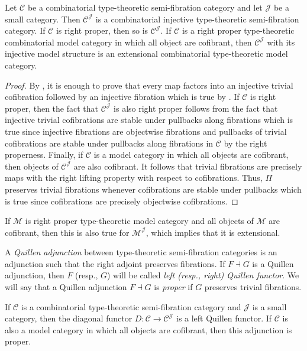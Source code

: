 \documentclass[reqno]{amsart}
\theoremstyle{definition}
\theoremstyle{remark}
\newcommand{\scat}[1]{\mathcal{#1}}
\numberwithin{figure}{section}
\begin{document}
\begin{cor}
Let $\scat{C}$ be a combinatorial type-theoretic semi-fibration category and let $\scat{J}$ be a small category.
Then $\scat{C}^\scat{J}$ is a combinatorial injective type-theoretic semi-fibration category.
If $\scat{C}$ is right proper, then so is $\scat{C}^\scat{J}$.
If $\scat{C}$ is a right proper type-theoretic combinatorial model category in which all object are cofibrant, then $\scat{C}^\scat{J}$ with its injective model structure is an extensional combinatorial type-theoretic model category.
\end{cor}
\begin{proof}
By , it is enough to prove that every map factors into an injective trivial cofibration followed by an injective fibration which is true by \cite[Lemma~A.2.8.3]{lurie-topos}.
If $\scat{C}$ is right proper, then the fact that $\scat{C}^\scat{J}$ is also right proper follows from the fact that injective trivial cofibrations are stable under pullbacks along fibrations which is true since injective fibrations are objectwise fibrations and pullbacks of trivial cofibrations are stable under pullbacks along fibrations in $\scat{C}$ by the right properness.
Finally, if $\scat{C}$ is a model category in which all objects are cofibrant, then objects of $\scat{C}^\scat{J}$ are also cofibrant.
It follows that trivial fibrations are precisely maps with the right lifting property with respect to cofibrations.
Thus, $\Pi$ preserves trivial fibrations whenever cofibrations are stable under pullbacks which is true since cofibrations are precisely objectwise cofibrations.
\end{proof}

\begin{example}
If $\scat{M}$ is right proper type-theoretic model category and all objects of $\scat{M}$ are cofibrant, then this is also true for $\scat{M}^\scat{J}$, which implies that it is extensional.
\end{example}

\begin{defn}
A \emph{Quillen adjunction} between type-theoretic semi-fibration categories is an adjunction such that the right adjoint preserves fibrations.
If $F \dashv G$ is a Quillen adjunction, then $F$ (resp., $G$) will be called \emph{left (resp., right) Quillen functor}.
We will say that a Quillen adjunction $F \dashv G$ is \emph{proper} if $G$ preserves trivial fibrations.
\end{defn}

\begin{example}
If $\scat{C}$ is a combinatorial type-theoretic semi-fibration category and $\scat{J}$ is a small category, then the diagonal functor $D : \scat{C} \to \scat{C}^\scat{J}$ is a left Quillen functor.
If $\scat{C}$ is also a model category in which all objects are cofibrant, then this adjunction is proper.
\end{example}
\end{document}
